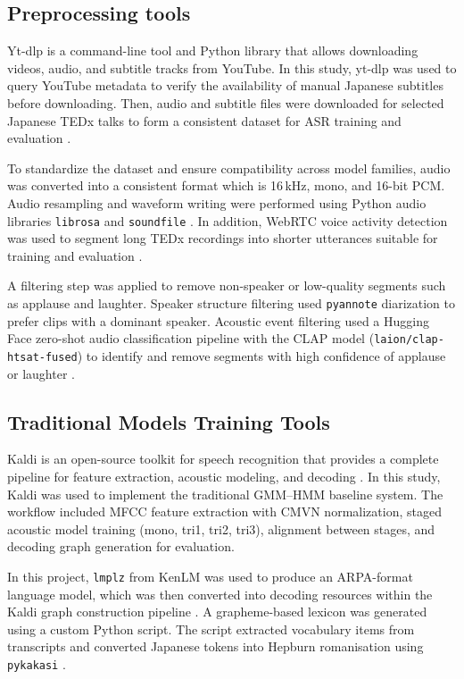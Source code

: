 \subsection{Preprocessing tools}
Yt-dlp is a command-line tool and Python library that allows downloading videos, audio, and subtitle tracks from YouTube. In this study, yt-dlp was used to query YouTube metadata to verify the availability of manual Japanese subtitles before downloading. Then, audio and subtitle files were downloaded for selected Japanese TEDx talks to form a consistent dataset for ASR training and evaluation \parencite{yt-dlp}. 

To standardize the dataset and ensure compatibility across model families, audio was converted into a consistent format which is 16\,kHz, mono, and 16-bit PCM. Audio resampling and waveform writing were performed using Python audio libraries \texttt{librosa} and \texttt{soundfile} \parencite{mcfee_2025_15006942,soundfile}. In addition, WebRTC voice activity detection was used to segment long TEDx recordings into shorter utterances suitable for training and evaluation \parencite{webrtc}.

A filtering step was applied to remove non-speaker or low-quality segments such as applause and laughter. Speaker structure filtering used \texttt{pyannote} diarization to prefer clips with a dominant speaker. Acoustic event filtering used a Hugging Face zero-shot audio classification pipeline with the CLAP model (\texttt{laion/clap-htsat-fused}) to identify and remove segments with high confidence of applause or laughter \parencite{clap}.

\subsection{Traditional Models Training Tools}
Kaldi is an open-source toolkit for speech recognition that provides a complete pipeline for feature extraction, acoustic modeling, and decoding \parencite{kaldi2011}. In this study, Kaldi was used to implement the traditional GMM--HMM baseline system. The workflow included MFCC feature extraction with CMVN normalization, staged acoustic model training (mono, tri1, tri2, tri3), alignment between stages, and decoding graph generation for evaluation.

In this project, \texttt{lmplz} from KenLM was used to produce an ARPA-format language model, which was then converted into decoding resources within the Kaldi graph construction pipeline \parencite{kenlm}. A grapheme-based lexicon was generated using a custom Python script. The script extracted vocabulary items from transcripts and converted Japanese tokens into Hepburn romanisation using \texttt{pykakasi} \parencite{pykakasi}. 

